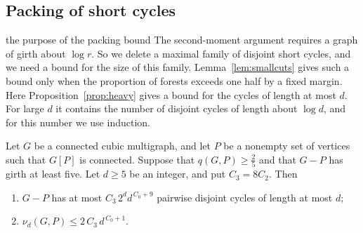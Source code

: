 \subsection{Packing of short cycles}\label{sec:packing}

\begin{idea}{the purpose of the packing bound}
The second-moment argument requires a graph of girth about $\log r$. So we delete a maximal
family of disjoint short cycles, and we need a bound for the size of this family.
Lemma~\ref{lem:smallcuts} gives such a bound only when the proportion of forests exceeds one half
by a fixed margin. Here Proposition~\ref{prop:heavy} gives a bound for the cycles of length at
most $d$. For large $d$ it contains the number of disjoint cycles of length about $\log d$, and
for this number we use induction.
\end{idea}

\begin{proposition}[Packing]\label{prop:packing}
Let $G$ be a connected cubic multigraph, and let $P$ be a nonempty set of vertices such that
$G[P]$ is connected. Suppose that $q(G,P)\ge\frac25$ and that $G-P$ has girth at least five. Let
$d\ge5$ be an integer, and put $C_3=8C_2$. Then
\begin{enumerate}
\item[\textup{(i)}] $G-P$ has at most $C_3\,2^{d}d^{\,C_0+9}$ pairwise disjoint cycles of length
at most $d$;
\item[\textup{(ii)}] $\nu_d(G,P)\le2\,C_3\,d^{\,C_0+1}$.
\end{enumerate}
\end{proposition}

